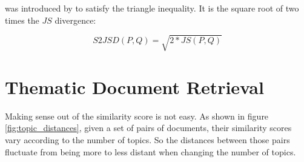 was introduced by \cite{Endres2003} to satisfy the triangle inequality. It is the square root of two times the $JS$ divergence:

\begin{equation}
    S2JSD(P,Q) = \sqrt{2*JS(P,Q)}
\label{eq:s2jsd}
\end{equation}


\section{Thematic Document Retrieval}


Making sense out of the similarity score is not easy. As shown in figure \ref{fig:topic_distances}, given a set of pairs of documents, their similarity scores vary according to the number of topics. So the distances between those pairs fluctuate from being more to less distant when changing the number of topics.

